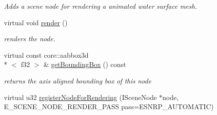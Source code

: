 \begin{DoxyCompactItemize}
\begin{DoxyCompactList}\small\item\em Adds a scene node for rendering a animated water surface mesh. \end{DoxyCompactList}\item 
\hypertarget{classirr_1_1scene_1_1_c_scene_manager_aebb8f228d8047fc04837675e60916883}{virtual void \hyperlink{classirr_1_1scene_1_1_c_scene_manager_aebb8f228d8047fc04837675e60916883}{render} ()}\label{classirr_1_1scene_1_1_c_scene_manager_aebb8f228d8047fc04837675e60916883}

\begin{DoxyCompactList}\small\item\em renders the node. \end{DoxyCompactList}\item 
\hypertarget{classirr_1_1scene_1_1_c_scene_manager_afaad00ace504de61a8557102a4ff7a17}{virtual const core\-::aabbox3d\\*
$<$ f32 $>$ \& \hyperlink{classirr_1_1scene_1_1_c_scene_manager_afaad00ace504de61a8557102a4ff7a17}{get\-Bounding\-Box} () const }\label{classirr_1_1scene_1_1_c_scene_manager_afaad00ace504de61a8557102a4ff7a17}

\begin{DoxyCompactList}\small\item\em returns the axis aligned bounding box of this node \end{DoxyCompactList}\item 
\hypertarget{classirr_1_1scene_1_1_c_scene_manager_ae37f87a15dae0cc0916e8f6e023d8270}{virtual u32 \hyperlink{classirr_1_1scene_1_1_c_scene_manager_ae37f87a15dae0cc0916e8f6e023d8270}{register\-Node\-For\-Rendering} (I\-Scene\-Node $\ast$node, E\-\_\-\-S\-C\-E\-N\-E\-\_\-\-N\-O\-D\-E\-\_\-\-R\-E\-N\-D\-E\-R\-\_\-\-P\-A\-S\-S pass=E\-S\-N\-R\-P\-\_\-\-A\-U\-T\-O\-M\-A\-T\-I\-C)}\label{classirr_1_1scene_1_1_c_scene_manager_ae37f87a15dae0cc0916e8f6e023d8270}


\end{DoxyCompactItemize}
